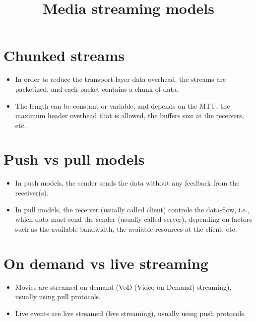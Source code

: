 \title{Media streaming models}

\maketitle
\tableofcontents

\section{Chunked streams}
\begin{itemize}
\item In order to reduce the transport layer data overhead, the
  streams are packetized, and each packet contains a chunk of data.
\item The length can be constant or variable, and depends on the MTU,
  the maximum header overhead that is allowed, the buffers size at the
  receivers, etc.
\end{itemize}

\section{Push vs pull models}
\begin{itemize}
\item In push models, the sender sends the data without any feedback
  from the receiver(s).
\item In pull models, the receiver (usually called client) controls
  the data-flow, i.e., which data must send the sender (usually called
  server), depending on factors such as the available bandwidth, the
  avaiable resources at the client, etc.
\end{itemize}

\section{On demand vs live streaming}
\begin{itemize}
\item Movies are streamed on demand (VoD (Video on Demand) streaming),
  usually using pull protocols.
\item Live events are live streamed (live streaming), usually using
  push protocols.
\end{itemize}



